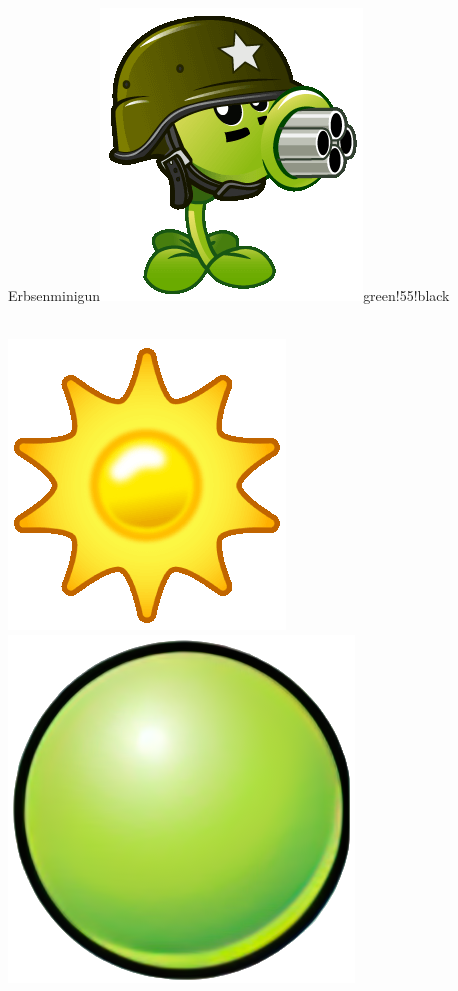 \documentclass[11pt, a5paper]{article}
\def\now{\hspace{0.2cm}}
\begin{document}
	\begin{mybox}{Erbsenminigun}{\includegraphics[scale=0.1]{minigun}}{green!55!black}
		\phantom{My}\\ \\
		\tcblower
		\begin{minipage}[t]{\textwidth}
			\vspace*{-1.2cm}
			\now\includegraphics[scale=0.1]{sun} 
			\now\includegraphics[scale=0.075]{peap} 

\end{minipage}
\end{mybox}
\end{document}
